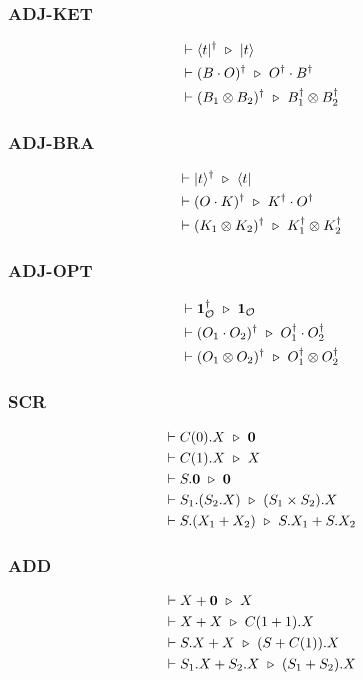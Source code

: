 \subsubsection*{\textsf{ADJ-KET}}
\begin{align*}
  & \vdash \langle t|^\dagger \ \triangleright\  |t\rangle\\
  & \vdash (B \cdot O)^\dagger \ \triangleright\  O^\dagger \cdot B^\dagger \\
  & \vdash (B_1 \otimes B_2)^\dagger \ \triangleright\  B_1^\dagger \otimes B_2^\dagger
\end{align*}

\subsubsection*{\textsf{ADJ-BRA}}
\begin{align*}
  & \vdash |t\rangle^\dagger \ \triangleright\  \langle t|\\
  & \vdash (O \cdot K)^\dagger \ \triangleright\  K^\dagger \cdot O^\dagger \\
  & \vdash (K_1 \otimes K_2)^\dagger \ \triangleright\  K_1^\dagger \otimes K_2^\dagger
\end{align*}

\subsubsection*{\textsf{ADJ-OPT}}
\begin{align*}
  & \vdash \mathbf{1}_\mathcal{O}^\dagger \ \triangleright\  \mathbf{1}_\mathcal{O}\\
  & \vdash (O_1 \cdot O_2)^\dagger \ \triangleright\  O_1^\dagger \cdot O_2^\dagger \\
  & \vdash (O_1 \otimes O_2)^\dagger \ \triangleright\  O_1^\dagger \otimes O_2^\dagger
\end{align*}

\subsubsection*{\textsf{SCR}}
\begin{align*}
  & \vdash C(0).X \ \triangleright\  \mathbf{0}\\
  & \vdash C(1).X \ \triangleright\  X \\
  & \vdash S.\mathbf{0} \ \triangleright\  \mathbf{0} \\
  & \vdash S_1.(S_2.X) \ \triangleright\  (S_1 \times S_2).X \\
  & \vdash S.(X_1 + X_2) \ \triangleright\  S.X_1 + S.X_2
\end{align*}

\subsubsection*{\textsf{ADD}}
\begin{align*}
  & \vdash X + \mathbf{0} \ \triangleright\  X \\
  & \vdash X + X \ \triangleright\  C(1 + 1).X \\
  & \vdash S.X + X \ \triangleright\  (S + C(1)).X \\
  & \vdash S_1.X + S_2.X \ \triangleright\  (S_1 + S_2).X
\end{align*}

